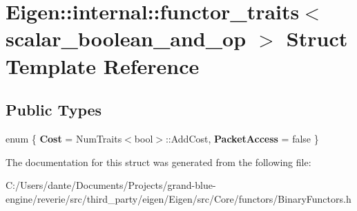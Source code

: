 \hypertarget{struct_eigen_1_1internal_1_1functor__traits_3_01scalar__boolean__and__op_01_4}{}\section{Eigen\+::internal\+::functor\+\_\+traits$<$ scalar\+\_\+boolean\+\_\+and\+\_\+op $>$ Struct Template Reference}
\label{struct_eigen_1_1internal_1_1functor__traits_3_01scalar__boolean__and__op_01_4}
\subsection*{Public Types}
\begin{DoxyCompactItemize}
\item 
\mbox{\label{struct_eigen_1_1internal_1_1functor__traits_3_01scalar__boolean__and__op_01_4_a45eff8dc62fb406952a9627b4849a9df}} 
enum \{ {\bfseries Cost} = Num\+Traits$<$bool$>$\+::Add\+Cost, 
{\bfseries Packet\+Access} = false
 \}
\end{DoxyCompactItemize}


The documentation for this struct was generated from the following file\+:\begin{DoxyCompactItemize}
\item 
C\+:/\+Users/dante/\+Documents/\+Projects/grand-\/blue-\/engine/reverie/src/third\+\_\+party/eigen/\+Eigen/src/\+Core/functors/Binary\+Functors.\+h\end{DoxyCompactItemize}
